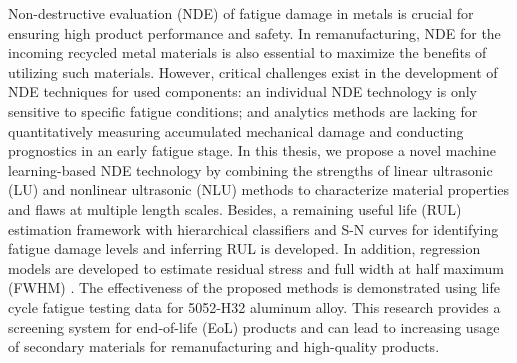 Non-destructive evaluation (NDE) of fatigue damage in metals is crucial for ensuring high product performance and safety. In remanufacturing, NDE for the incoming recycled metal materials is also essential to maximize the benefits of utilizing such materials. However, critical challenges exist in the development of NDE techniques for used components: an individual NDE technology is only sensitive to specific fatigue conditions; and analytics methods are lacking for quantitatively measuring accumulated mechanical damage and conducting prognostics in an early fatigue stage. In this thesis, we propose a novel machine learning-based NDE technology by combining the strengths of linear ultrasonic (LU) and nonlinear ultrasonic (NLU) methods to characterize material properties and flaws at multiple length scales. Besides, a remaining useful life (RUL) estimation framework with hierarchical classifiers and S-N curves for identifying fatigue damage levels and inferring RUL is developed. In addition, regression models are developed to estimate residual stress and full width at half maximum (FWHM) . The effectiveness of the proposed methods is demonstrated using life cycle fatigue testing data for 5052-H32 aluminum alloy. This research provides a screening system for end-of-life (EoL) products and can lead to increasing usage of secondary materials for remanufacturing and high-quality products.
